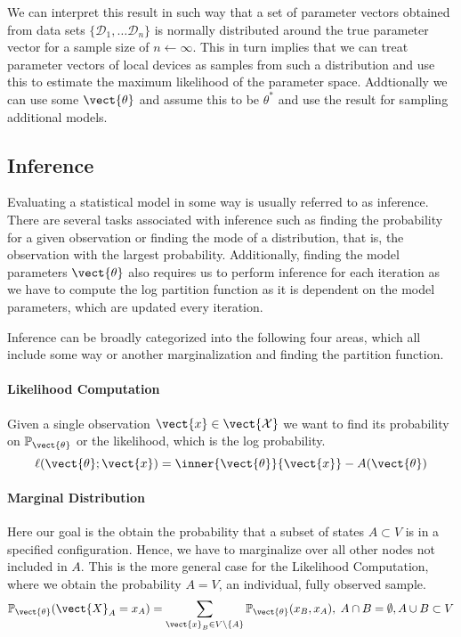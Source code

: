         We can interpret this result in such way that a set of parameter vectors obtained from data sets $\{\mathcal{D}_1, \ldots \mathcal{D}_n\}$ is normally distributed around the true parameter vector for a sample size of $n \leftarrow \infty$. 
        This in turn implies that we can treat parameter vectors of local devices as samples from such a distribution and use this to estimate the maximum likelihood of the parameter space.
        Addtionally we can use some $\vect{\theta}$ and assume this to be $\theta^*$ and use the result for sampling additional models.
        

\subsection{Inference}
\label{ssec:inf}
Evaluating a statistical model in some way is usually referred to as inference.
There are several tasks associated with inference such as finding the probability for a given observation or finding the mode of a distribution, that is, the observation with the largest probability.
Additionally, finding the model parameters $\vect{\theta}$ also requires us to perform inference for each iteration as we have to compute the log partition function as it is dependent on the model parameters, which are updated every iteration.

Inference can be broadly categorized into the following four areas, which all include some way or another marginalization and finding the partition function.

\paragraph*{Likelihood Computation}
Given a single observation $\vect{x} \in \vect{\mathcal{X}}$ we want to find its probability on $\mathbb{P}_{\vect{\theta}}$ or the likelihood, which is the log probability.
\begin{equation}
    \ell(\vect{\theta}; \vect{x}) = \inner{\vect{\theta}}{\vect{x}} - A(\vect{\theta})
\end{equation}

\paragraph*{Marginal Distribution}
Here our goal is the obtain the probability that a subset of states $A \subset V$ is in a specified configuration.
Hence, we have to marginalize over all other nodes not included in $A$. 
This is the more general case for the Likelihood Computation, where we obtain the probability $A = V$, an individual, fully observed sample.
    \begin{equation}
        \mathbb{P}_{\vect{\theta}}(\vect{X}_A = x_A) = \sum_{\vect{x}_B \in V \setminus\{A\}} \mathbb{P}_{\vect{\theta}}(x_B , x_A), \; A \cap B = \emptyset, A \cup B \subset V
    \end{equation}

